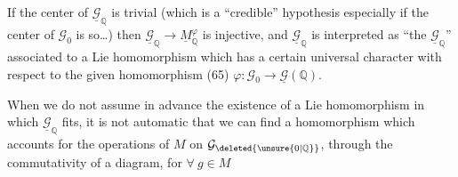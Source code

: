 If the center of $\underline{\mathcal{G}}_{\mathbb Q}$ is trivial (which is a ``credible'' hypothesis especially if the center of $\mathcal{G}_0$ is so\ldots) then $\underline{\mathcal{G}}_{\mathbb Q}\longrightarrow\underline{M}_{\mathbb Q}^{\varphi}$ is injective, and $\underline{\mathcal{G}}_{\mathbb Q}$ is interpreted as ``the $\underline{\mathcal{G}}_{\mathbb Q}$'' associated to a Lie homomorphism
which has a certain universal character with respect to the given homomorphism (65) $\varphi:\mathcal{G}_0\longrightarrow\underline{\mathcal{G}}(\mathbb Q)$.

When we do not assume in advance the existence of a  Lie homomorphism in which $\underline{\mathcal{G}}_{\mathbb Q}$ fits, it is not automatic that we can find a homomorphism
which accounts for the operations of $M$ on $\mathcal{G}_{\deleted{\unsure{0|\mathbb Q}}}$, through the commutativity of a diagram, for $\forall\ g\in M$

